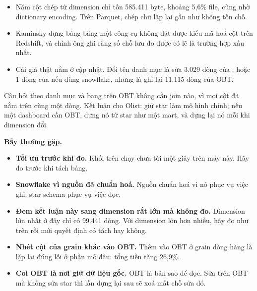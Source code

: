 \begin{itemize}
  \item Năm cột chép từ dimension chỉ tốn 585.411 byte, khoảng 5,6\% file, cũng nhờ dictionary encoding. Trên Parquet, chép chữ lặp lại gần như không tốn chỗ.
  \item Kaminsky dựng bảng bằng một công cụ không đặt được kiểu mã hoá cột trên Redshift, và chính ông ghi rằng số chỗ lưu đo được có lẽ là trường hợp xấu nhất.
  \item Cái giá thật nằm ở cập nhật. Đổi tên danh mục  là sửa 3.029 dòng của , hoặc 1 dòng của  nếu dùng snowflake, nhưng là ghi lại 11.115 dòng của OBT.
\end{itemize}

Câu hỏi theo danh mục và bang trên OBT không cần join nào, vì mọi cột đã nằm trên cùng một dòng. Kết luận cho Olist: giữ star làm mô hình chính; nếu một dashboard cần OBT, dựng nó từ star như một mart, và dựng lại nó mỗi khi dimension đổi.

\begin{luuy}
\textbf{Bẫy thường gặp.}
\begin{itemize}
  \item \textbf{Tối ưu trước khi đo.} Khối trên chạy chưa tới một giây trên máy này. Hãy đo trước khi tách bảng.
  \item \textbf{Snowflake vì nguồn đã chuẩn hoá.} Nguồn chuẩn hoá vì nó phục vụ việc ghi; star schema phục vụ việc đọc.
  \item \textbf{Đem kết luận này sang dimension rất lớn mà không đo.} Dimension lớn nhất ở đây chỉ có 99.441 dòng. Với dimension lớn hơn nhiều, hãy đo như trên rồi mới quyết định có tách hay không.
  \item \textbf{Nhét cột của grain khác vào OBT.} Thêm  vào OBT ở grain dòng hàng là lặp lại đúng lỗi ở phần mở đầu: tổng tiền tăng 26,9\%.
  \item \textbf{Coi OBT là nơi giữ dữ liệu gốc.} OBT là bản sao để đọc. Sửa trên OBT mà không sửa star thì lần dựng lại sau sẽ xoá mất chỗ sửa đó.
\end{itemize}
\end{luuy}

